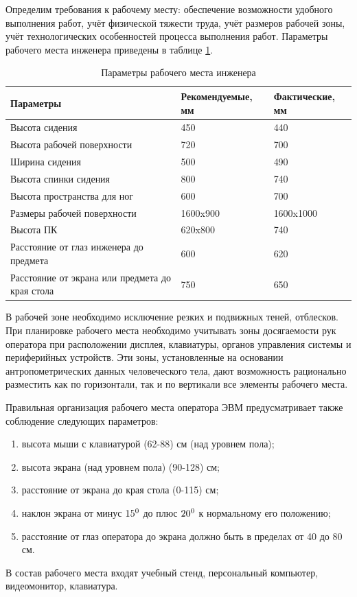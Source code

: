 Определим требования к рабочему месту: обеспечение возможности удобного выполнения работ, учёт физической тяжести труда, учёт размеров рабочей зоны, учёт технологических особенностей процесса выполнения работ. Параметры рабочего места инженера приведены в таблице \ref{tab:arm_ing_locate}.

\begin{longtable}[!ht]{|m{}|m{}|m{}|}
\caption{Параметры рабочего места инженера}
\label{tab:arm_ing_locate}
\\ \hline
Параметры &  Рекомендуемые, мм &  Фактические, мм\\\hline
Высота сидения &  450 &  440\\\hline
Высота рабочей поверхности &  720 &  700\\\hline
Ширина сидения &  500 &  490\\\hline
Высота спинки сидения &  800 &  740\\\hline
Высота пространства для ног &  600 &  700\\\hline
Размеры рабочей поверхности &  1600x900 &  1600x1000\\\hline
Высота ПК &  620x800 &  740\\\hline
Расстояние от глаз инженера до предмета &  600 &  620\\\hline
Расстояние от экрана или предмета до края стола &  750 &  650\\\hline
\end{longtable}

В рабочей зоне необходимо исключение резких и подвижных теней, отблесков. При планировке рабочего места необходимо учитывать зоны досягаемости рук оператора при расположении дисплея, клавиатуры, органов управления системы и периферийных устройств. Эти зоны, установленные на основании антропометрических данных человеческого тела, дают возможность рационально разместить как по горизонтали, так и по вертикали все элементы рабочего места.

Правильная организация рабочего места оператора ЭВМ предусматривает также соблюдение следующих параметров:

\begin{enumerate}
\item высота мыши с клавиатурой (62-88) см (над уровнем пола);
\item высота экрана (над уровнем пола) (90-128) см;
\item расстояние от экрана до края стола (0-115) см;
\item наклон экрана от минус $15\textsuperscript{0}$ до плюс $20\textsuperscript{0}$ к нормальному его положению;
\item расстояние от глаз оператора до экрана должно быть в пределах от 40 до 80 см.
\end{enumerate}
В состав рабочего места входят учебный стенд, персональный компьютер, видеомонитор, клавиатура.

